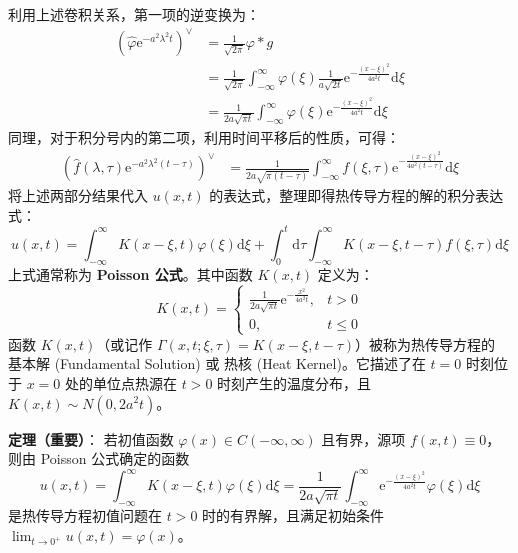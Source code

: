 \documentclass[12pt,a4paper]{ctexart}
\begin{document}
	利用上述卷积关系，第一项的逆变换为：
	\begin{align*}
		\left( \hat{\varphi} \mathrm{e}^{-a^2 \lambda^2 t} \right)^{\vee} &= \frac{1}{\sqrt{2\pi}} \varphi * g \\
		&= \frac{1}{\sqrt{2\pi}} \int_{-\infty}^{\infty} \varphi(\xi) \frac{1}{a\sqrt{2t}} \mathrm{e}^{-\frac{(x-\xi)^2}{4a^2 t}} \mathrm{d}\xi \\
		&= \frac{1}{2a\sqrt{\pi t}} \int_{-\infty}^{\infty} \varphi(\xi) \mathrm{e}^{-\frac{(x-\xi)^2}{4a^2 t}} \mathrm{d}\xi
	\end{align*}
	同理，对于积分号内的第二项，利用时间平移后的性质，可得：
	\begin{align*}
		\left( \hat{f}(\lambda, \tau) \mathrm{e}^{-a^2 \lambda^2 (t-\tau)} \right)^{\vee} &= \frac{1}{2a\sqrt{\pi (t-\tau)}} \int_{-\infty}^{\infty} f(\xi, \tau) \mathrm{e}^{-\frac{(x-\xi)^2}{4a^2 (t-\tau)}} \mathrm{d}\xi
	\end{align*}
	将上述两部分结果代入 $u(x,t)$ 的表达式，整理即得热传导方程的解的积分表达式：
	\begin{equation}
		u(x,t) = \int_{-\infty}^{\infty} K(x-\xi, t) \varphi(\xi) \mathrm{d}\xi + \int_0^t \mathrm{d}\tau \int_{-\infty}^{\infty} K(x-\xi, t-\tau) f(\xi, \tau) \mathrm{d}\xi
	\end{equation}
	上式通常称为 \textbf{Poisson 公式}。其中函数 $K(x,t)$ 定义为：
	\begin{equation}
		K(x,t) = \begin{cases}
			\frac{1}{2a\sqrt{\pi t}} \mathrm{e}^{-\frac{x^2}{4a^2 t}}, & t > 0 \\
			0, & t \leqslant 0
		\end{cases}
	\end{equation}
	函数 $K(x,t)$（或记作 $\Gamma(x, t; \xi, \tau) = K(x-\xi, t-\tau)$）被称为热传导方程的 基本解 (Fundamental Solution) 或 热核 (Heat Kernel)。它描述了在 $t=0$ 时刻位于 $x=0$ 处的单位点热源在 $t>0$ 时刻产生的温度分布，且$K(x,t) \sim N(0, 2a^2t)$。
	
	\vspace{1em} %
	
	\noindent\textbf{定理（重要）}：
	若初值函数 $\varphi(x) \in C(-\infty, \infty)$ 且有界，源项 $f(x,t) \equiv 0$，则由 Poisson 公式确定的函数
	\begin{equation}
		u(x,t) = \int_{-\infty}^{\infty} K(x-\xi, t) \varphi(\xi) \mathrm{d}\xi = \frac{1}{2a\sqrt{\pi t}} \int_{-\infty}^{\infty} \mathrm{e}^{-\frac{(x-\xi)^2}{4a^2 t}} \varphi(\xi) \mathrm{d}\xi
	\end{equation}
	是热传导方程初值问题在 $t>0$ 时的有界解，且满足初始条件 $\lim_{t \to 0^+} u(x,t) = \varphi(x)$。
	
\end{document}
